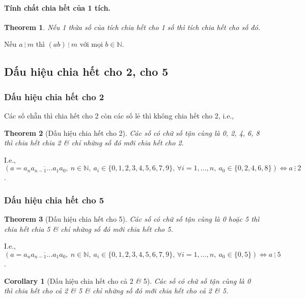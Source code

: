 \documentclass{article}
\numberwithin{equation}{section}
\newtheorem{corollary}{Corollary}[section]
\newtheorem{theorem}{Theorem}[section]
\begin{document}
\paragraph{Tính chất chia hết của 1 tích.}
\begin{theorem}
	Nếu 1 thừa số của tích chia hết cho 1 số thì tích chia hết cho số đó.
\end{theorem}
Nếu $a\ \vdots\ m$  thì $(ab)\ \vdots\ m$ với mọi $b\in\mathbb{N}$.

\subsection{Dấu hiệu chia hết cho 2, cho 5}

\subsubsection{Dấu hiệu chia hết cho 2}
Các số chẵn thì chia hết cho 2 còn các số lẻ thì không chia hết cho 2, i.e.,

\begin{theorem}[Dấu hiệu chia hết cho 2]
	Các số có chữ số tận cùng là 0, 2, 4, 6, 8 thì chia hết chia 2 \textit{\&} chỉ những số đó mới chia hết cho 2.
\end{theorem}
I.e., $(a = \overline{a_na_{n-1}\ldots a_1a_0},\ n\in\mathbb{N},\ a_i\in\{0,1,2,3,4,5,6,7,9\},\,\forall i = 1,\ldots,n,\ a_0\in\{0,2,4,6,8\})\Leftrightarrow a\ \vdots\ 2$.

\subsubsection{Dấu hiệu chia hết cho 5}
\begin{theorem}[Dấu hiệu chia hết cho 5]
	Các số có chữ số tận cùng là 0 hoặc 5 thì chia hết chia 5 \textit{\&} chỉ những số đó mới chia hết cho 5.
\end{theorem}
I.e., $(a = \overline{a_na_{n-1}\ldots a_1a_0},\ n\in\mathbb{N},\ a_i\in\{0,1,2,3,4,5,6,7,9\},\,\forall i = 1,\ldots,n,\ a_0\in\{0,5\})\Leftrightarrow a\ \vdots\ 5$.

\begin{corollary}[Dấu hiệu chia hết cho cả 2 \textit{\&} 5]
	Các số có chữ số tận cùng là 0 thì chia hết cho cả 2 \textit{\&} 5 \textit{\&} chỉ những số đó mới chia hết cho cả 2 \textit{\&} 5.
\end{corollary}
\end{document}
